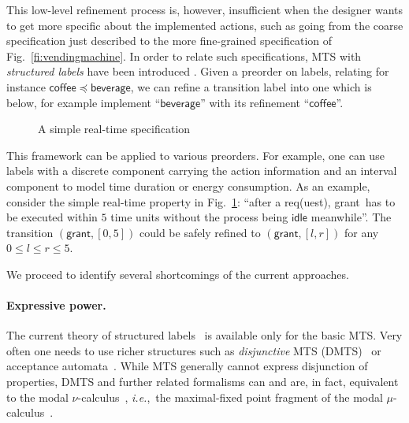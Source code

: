 \documentclass[twocolumn]{svjour3-dummy}
\newcommand{\edgelabel}[1]{\ensuremath{\mathsf{#1}}}
\newcommand{\beverage}{\edgelabel{beverage}}
\newcommand{\coffee}{\edgelabel{coffee}}
\newcommand*\labpre{\preccurlyeq}
\newcommand*\req{\textsf{req}}
\newcommand*\grant{\textsf{grant}}
\newcommand*\idle{\textsf{idle}}
\newcommand*\ie{\textit{i.e.},}
\begin{document}
This low-level refinement process is, however, insufficient when the
designer wants to get more specific about the implemented actions, such
as going from the coarse specification just described to the more
fine-grained specification of Fig.~\ref{fi:vendingmachine}.  In order to
relate such specifications, MTS with \emph{structured labels} have been
introduced \cite{DBLP:journals/mscs/BauerJLLS12}. Given a preorder on
labels, relating for instance $\coffee\labpre\beverage$, we can refine a
transition label into one which is below, for example implement
``\beverage'' with its refinement ``\coffee''.

\begin{figure}
  \centering
  \caption{\label{fi:realtimeexint}
    A simple real-time specification}
\end{figure}

This framework can be applied to various preorders. For example, one can
use labels with a discrete component carrying the action information and
an interval component to model time duration or energy consumption.  As
an example, consider the simple real-time property in
Fig.~\ref{fi:realtimeexint}: ``after a \req(uest), \grant\ has to be
executed within $5$ time units without the process being $\idle$
meanwhile''. The transition $(\grant,[0,5])$ could be safely refined to
$(\grant,[l, r])$ for any $0\le l\le r\le 5$.

We proceed to identify several shortcomings of the current approaches.

\paragraph{Expressive power.} 

The current theory of structured
labels~\cite{DBLP:journals/mscs/BauerJLLS12,
  DBLP:journals/acta/FahrenbergL14} is available only for the basic
MTS. Very often one needs to use richer structures such as
\emph{disjunctive} MTS (DMTS)~\cite{DBLP:conf/lics/LarsenX90,
  DBLP:conf/atva/BenesCK11} or acceptance
automata~\cite{report/irisa/Raclet07,
  DBLP:journals/jacm/Hennessy85}. While MTS generally cannot express
disjunction of properties, DMTS and further related formalisms can and
are, in fact, equivalent to the modal
$\nu$-calculus~\cite{DBLP:conf/concur/BenesDFKL13,
  DBLP:conf/ictac/FahrenbergLT14}, \ie~the maximal-fixed point
fragment of the modal $\mu$-calculus~\cite{DBLP:journals/tcs/Kozen83}.
\end{document}
